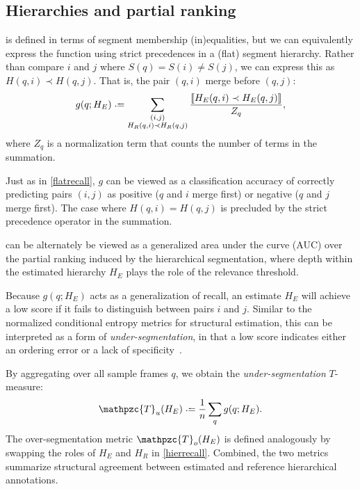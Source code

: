 \documentclass{article}
\def\shag{\ensuremath{\mathpzc{T}}}
\begin{document}
\subsection{Hierarchies and partial ranking}

 is defined in terms of segment membership (in)equalities, but we can equivalently express the function using strict precedences in a (flat) segment hierarchy.
Rather than compare $i$ and $j$ where $S(q) = S(i) \neq S(j)$, we can express this as $H(q, i) \prec H(q, j)$.
That is, the pair $(q,i)$ merge before $(q,j)$:
\begin{equation}
g(q ; H_E) \defeq \sum_{\substack{(i, j)\\ H_R(q, i) \prec H_R(q, j)}}
\frac{\ind{H_E(q, i) \prec H_E(q, j)}}{Z_q},\label{hierrecall}
\end{equation}
where $Z_q$ is a normalization term that counts the number of terms in the summation.

Just as in \cref{flatrecall}, $g$ can be viewed as a classification accuracy of correctly predicting pairs $(i, j)$ as positive ($q$ and $i$ merge first) or negative ($q$ and $j$ merge first).
The case where $H(q, i) = H(q, j)$ is precluded by the strict precedence operator in the summation.

 can be alternately be viewed as a generalized area under the curve (AUC) over the partial ranking induced by the hierarchical segmentation, where depth within the estimated hierarchy $H_E$ plays the role of the relevance threshold.

Because $g(q; H_E)$ acts as a generalization of recall, an estimate $H_E$ will achieve a low score if it fails to distinguish between pairs $i$ and $j$.
Similar to the normalized conditional entropy metrics for structural estimation, this can be interpreted as a form of \emph{under-segmentation}, in that a low score indicates either an ordering error or a lack of specificity~\cite{Lukashevich2008}.  

By aggregating over all sample frames $q$, we obtain the \emph{under-segmentation} $T$-measure:
\begin{equation}
\shag_u(H_E) \defeq \frac{1}{n} \sum_q g(q ; H_E).\label{shagunder}
\end{equation}
The over-segmentation metric $\shag_o(H_E)$ is defined analogously by swapping the roles of $H_E$ and $H_R$ in \cref{hierrecall}.
Combined, the two metrics summarize structural agreement between estimated and reference hierarchical annotations.
\end{document}

